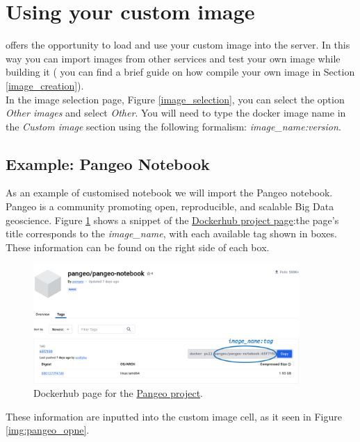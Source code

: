 \section{Using your custom image}
\uninuvola offers the opportunity to load and use your custom image into the server. In this way you can import images from other services and test your own image while building it ( you can find a brief guide on how compile your own image in Section \ref{image_creation}). \\

In  the image selection page, Figure  \ref{image_selection}, you can select the option \textit{Other images} and select \textit{Other}. You will need to type the docker image name in the \textit{Custom image} section using the following formalism: \textit{image\_name:version}. 

\subsection{Example: Pangeo Notebook}
As an example of customised notebook we will import the Pangeo notebook. Pangeo is a community promoting open, reproducible, and scalable Big Data geoscience. Figure \ref{img:pangeo} shows a snippet of the \href{https://hub.docker.com/r/pangeo/pangeo-notebook/tags}{Dockerhub project page}:the page's  title corresponds to the \textit{image\_name}, with each available tag shown in boxes. These information can be found on the right side of each box. 

\begin{figure}[htbp]
    \centering
    \includegraphics[width=0.9\textwidth]{figures/pangeo.pdf}
    \caption{Dockerhub page for the \href{https://hub.docker.com/r/pangeo/pangeo-notebook/tags}{Pangeo project}. }
    \label{img:pangeo}
\end{figure}

These information are inputted into the custom image cell, as it seen in Figure \ref{img:pangeo_opne}.

